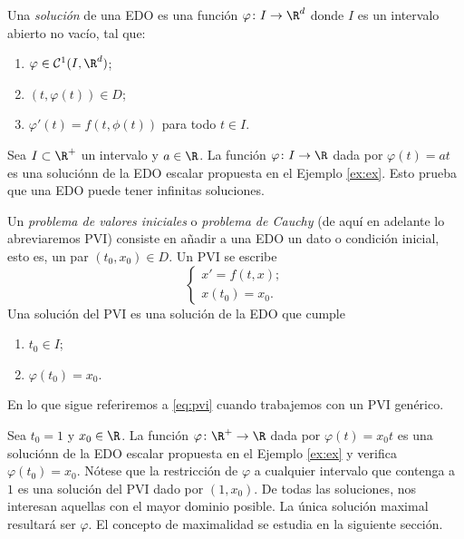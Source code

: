 \documentclass{article}
\begin{document}
  \begin{definition}
    Una \emph{solución} de una EDO es una función $\varphi \colon I \to \R^d$ donde $I$ es un intervalo
    abierto no vacío, tal que:
    \begin{enumerate}
    \item $\varphi \in \mathcal{C}^1(I, \R^d)$;
    \item $(t, \varphi(t)) \in D$;
    \item $\varphi'(t) = f(t, \phi(t))$ para todo $t \in I$.
    \end{enumerate}
  \end{definition}

  \begin{ex} Sea $I \subset \R^+$ un intervalo y $a \in \R$. La función $\varphi \colon I \to \R$ dada por
    $\varphi(t) = at$ es una soluciónn de la EDO escalar propuesta en el Ejemplo \ref{ex:ex}. Esto
    prueba que una EDO puede tener infinitas soluciones.
  \end{ex}

  
  \begin{definition}
    Un \emph{problema de valores iniciales} o \emph{problema de Cauchy} (de aquí en adelante lo
    abreviaremos PVI) consiste en añadir a una EDO un dato o condición inicial, esto es, un par
    $(t_0, x_0) \in D$. Un PVI se escribe
    \begin{equation}
      \label{eq:pvi}
      \left\{
        \begin{array}{l}
          x' = f(t,x); \\
          x(t_0) = x_0.
        \end{array}
      \right.
      \tag{P}
    \end{equation}
    Una solución del PVI es una solución de la EDO que cumple
    \begin{enumerate}
    \item $t_0 \in I$;
    \item $\varphi(t_0) = x_0$.
    \end{enumerate}
  \end{definition}

  En lo que sigue referiremos a \eqref{eq:pvi} cuando trabajemos con un PVI genérico.

  \begin{ex} Sea $t_0 = 1$ y $x_0 \in \R$.  La función $\varphi \colon \R^+ \to \R$ dada por
    $\varphi(t) = x_0t$ es una soluciónn de la EDO escalar propuesta en el Ejemplo \ref{ex:ex} y
    verifica $\varphi(t_0) = x_0$. Nótese que la restricción de $\varphi$ a cualquier intervalo que
    contenga a $1$ es una solución del PVI dado por $(1, x_0)$. De todas las soluciones, nos
    interesan aquellas con el mayor dominio posible. La única solución maximal resultará ser
    $\varphi$. El concepto de maximalidad se estudia en la siguiente sección.
  \end{ex}
\end{document}
